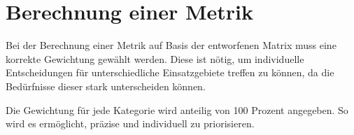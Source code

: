 \section{Berechnung einer Metrik}
\label{ch:matrix:berechnung}
Bei der Berechnung einer Metrik auf Basis der entworfenen Matrix muss eine korrekte Gewichtung gewählt werden. 
Diese ist nötig, um individuelle Entscheidungen für unterschiedliche Einsatzgebiete treffen zu können,
da die Bedürfnisse dieser stark unterscheiden können. 

Die Gewichtung für jede Kategorie wird anteilig von 100 Prozent angegeben.
So wird es ermöglicht, präzise und individuell zu priorisieren.



